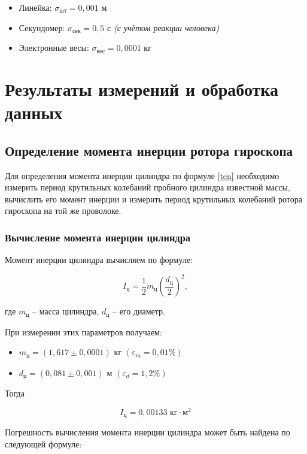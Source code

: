     \begin{itemize}
	\item Линейка: $ \sigma_\text{шт} = 0,001 $ м
	\item Секундомер: $ \sigma_\text{сек} = 0,5 $ с \textit{(с учётом реакции человека)}
	\item Электронные весы: $ \sigma_\text{вес} = 0,0001 $ кг
\end{itemize}




\section{Результаты измерений и обработка данных}

\subsection{Определение момента инерции ротора гироскопа}

    Для определения момента инерции цилиндра по формуле \eqref{ten} необходимо измерить период крутильных колебаний пробного цилиндра известной массы, вычислить его момент инерции и измерить период крутильных колебаний ротора гироскопа на той же проволоке.

\subsubsection{Вычисление момента инерции цилиндра}

    Момент инерции цилиндра вычисляем по формуле:

\[
I_\text{ц} = \frac{1}{2}m_\text{ц}\left( \frac{d_\text{ц}}{2}\right)^2,
\]

    где $ m_\text{ц} $ -- масса цилиндра, $ d_\text{ц} $ -- его диаметр.

    При измерении этих параметров получаем:
    
\begin{itemize}
	\item $ m_\text{ц} = \left( 1,617 \pm 0,0001\right) $ кг 
	$(\varepsilon_m = 0,01\%)$
	\item $ d_\text{ц} = \left( 0,081 \pm 0,001 \right) $ м
	$(\varepsilon_d = 1,2\%)$
\end{itemize}

    Тогда

\[
I_\text{ц} = 0,00133 \text{ кг} \cdot \text{м}^2
\]

    Погрешность вычисления момента инерции цилиндра может быть найдена по следующей формуле:

